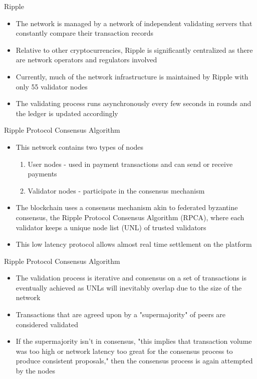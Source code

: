 \documentclass[9pt]{beamer}
\begin{document}

\begin{frame}{Ripple}
	\begin{itemize}
		\item The network is managed by a network of independent validating servers that constantly compare their transaction records
		\item Relative to other cryptocurrencies, Ripple is significantly centralized as there are network operators and regulators involved
		\item Currently, much of the network infrastructure is maintained by Ripple with only 55 validator nodes
		\item The validating process runs asynchronously every few seconds in rounds and the ledger is updated accordingly
	\end{itemize}
\end{frame}


\begin{frame}{Ripple Protocol Consensus Algorithm}
	\begin{itemize}
		\item This network contains two types of nodes
		\begin{enumerate}
			\item User nodes - used in payment transactions and can send or receive payments
			\item Validator nodes - participate in the consensus mechanism
		\end{enumerate}
		\item The blockchain uses a consensus mechanism akin to federated byzantine consensus, the Ripple Protocol Consensus Algorithm (RPCA), where each validator keeps a unique node list (UNL) of trusted validators
		\item This low latency protocol allows almost real time settlement on the platform
	\end{itemize}
\end{frame}


\begin{frame}{Ripple Protocol Consensus Algorithm}
	\begin{itemize}
		\item The validation process is iterative and consensus on a set of transactions is eventually achieved as UNLs will inevitably overlap due to the size of the network
		\item Transactions that are agreed upon by a "supermajority" of peers are considered validated
		\item If the supermajority isn't in consensus, "this implies that transaction volume was too high or network latency too great for the consensus process to produce consistent proposals," then the consensus process is again attempted by the nodes
	\end{itemize}
\end{frame}
\end{document}
